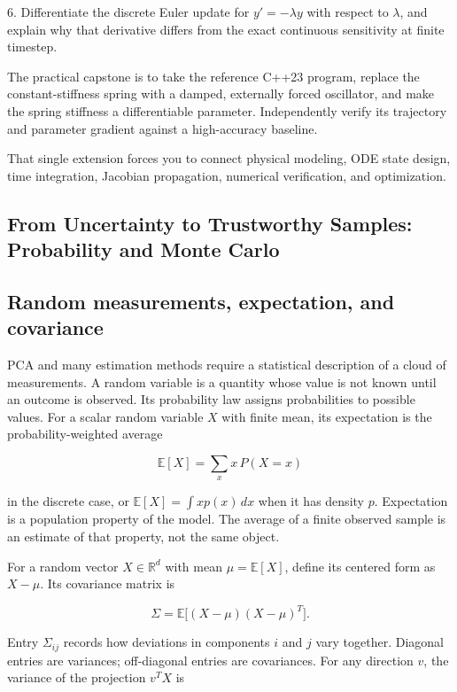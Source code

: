 6. Differentiate the discrete Euler update for \(y'=-\lambda y\) with respect to \(\lambda\), and explain why that derivative differs from the exact continuous sensitivity at finite timestep.

The practical capstone is to take the reference C++23 program, replace the constant-stiffness spring with a damped, externally forced oscillator, and make the spring stiffness a differentiable parameter. Independently verify its trajectory and parameter gradient against a high-accuracy baseline.

That single extension forces you to connect physical modeling, ODE state design, time integration, Jacobian propagation, numerical verification, and optimization.

\subsection{From Uncertainty to Trustworthy Samples: Probability and Monte Carlo}\label{from-uncertainty-to-trustworthy-samples-probability-and-monte-carlo}

\subsection{Random measurements, expectation, and covariance}\label{random-measurements-expectation-and-covariance}

PCA and many estimation methods require a statistical description of a cloud of measurements. A random variable is a quantity whose value is not known until an outcome is observed. Its probability law assigns probabilities to possible values. For a scalar random variable \(X\) with finite mean, its expectation is the probability-weighted average

\[
\mathbb E[X]=\sum_x x\,P(X=x)
\]

in the discrete case, or \(\mathbb E[X]=\int x p(x)\,dx\) when it has density \(p\). Expectation is a population property of the model. The average of a finite observed sample is an estimate of that property, not the same object.

For a random vector \(X\in\mathbb R^d\) with mean \(\mu=\mathbb E[X]\), define its centered form as \(X-\mu\). Its covariance matrix is

\[
\Sigma=\mathbb E\big[(X-\mu)(X-\mu)^T\big].
\]

Entry \(\Sigma_{ij}\) records how deviations in components \(i\) and \(j\) vary together. Diagonal entries are variances; off-diagonal entries are covariances. For any direction \(v\), the variance of the projection \(v^TX\) is

